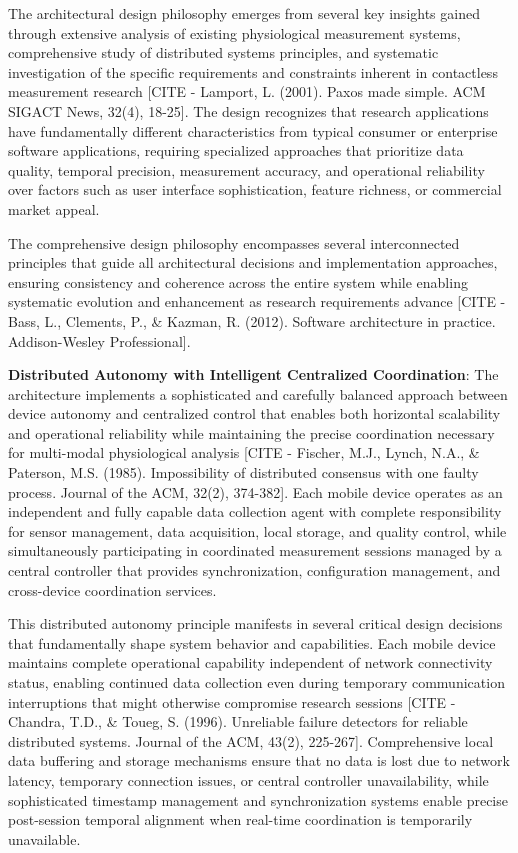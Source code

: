 \documentclass[12pt,a4paper]{article}
\begin{document}
The architectural design philosophy emerges from several key insights gained through extensive analysis of existing
physiological measurement systems, comprehensive study of distributed systems principles, and systematic investigation
of the specific requirements and constraints inherent in contactless measurement
research [CITE - Lamport, L. (2001). Paxos made simple. ACM SIGACT News, 32(4), 18-25]. The design recognizes that
research applications have fundamentally different characteristics from typical consumer or enterprise software
applications, requiring specialized approaches that prioritize data quality, temporal precision, measurement accuracy,
and operational reliability over factors such as user interface sophistication, feature richness, or commercial market
appeal.

The comprehensive design philosophy encompasses several interconnected principles that guide all architectural decisions
and implementation approaches, ensuring consistency and coherence across the entire system while enabling systematic
evolution and enhancement as research requirements
advance [CITE - Bass, L., Clements, P., \& Kazman, R. (2012). Software architecture in practice. Addison-Wesley Professional].

\textbf{Distributed Autonomy with Intelligent Centralized Coordination}: The architecture implements a sophisticated and
carefully balanced approach between device autonomy and centralized control that enables both horizontal scalability and
operational reliability while maintaining the precise coordination necessary for multi-modal physiological
analysis [CITE - Fischer, M.J., Lynch, N.A., \& Paterson, M.S. (1985). Impossibility of distributed consensus with one faulty process. Journal of the ACM, 32(2), 374-382].
Each mobile device operates as an independent and fully capable data collection agent with complete responsibility for
sensor management, data acquisition, local storage, and quality control, while simultaneously participating in
coordinated measurement sessions managed by a central controller that provides synchronization, configuration
management, and cross-device coordination services.

This distributed autonomy principle manifests in several critical design decisions that fundamentally shape system
behavior and capabilities. Each mobile device maintains complete operational capability independent of network
connectivity status, enabling continued data collection even during temporary communication interruptions that might
otherwise compromise research
sessions [CITE - Chandra, T.D., \& Toueg, S. (1996). Unreliable failure detectors for reliable distributed systems. Journal of the ACM, 43(2), 225-267].
Comprehensive local data buffering and storage mechanisms ensure that no data is lost due to network latency, temporary
connection issues, or central controller unavailability, while sophisticated timestamp management and synchronization
systems enable precise post-session temporal alignment when real-time coordination is temporarily unavailable.
\end{document}
